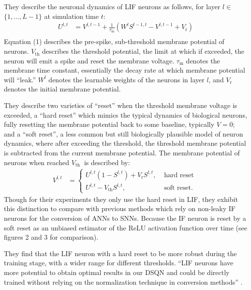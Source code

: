\documentclass[journal,onecolumn]{IEEEtran}
\begin{document}
They describe the neuronal dynamics of LIF neurons as follows, for
layer \(l \in\) \(\{1, \ldots, L-1\}\) at simulation time \(t\): \[
\begin{aligned}
U^{l, t} & =V^{l, t-1}+\frac{1}{\tau_{\mathrm{m}}}\left(W^l S^{l-1, t}-V^{l, t-1}+V_{\mathrm{r}}\right) \\
\end{aligned}
\] Equation (1) describes the pre-spike, sub-threshold membrane potential
of neurons. \(V_{\mathrm{th}}\) describes the threshold potential, the
limit at which if exceeded, the neuron will emit a spike and reset the
membrane voltage. \(\tau_{\mathrm{m}}\) denotes the membrane time
constant, essentially the decay rate at which membrane potential will
``leak.'' \(W^l\) denotes the learnable weights of the neurons in layer
\(l\), and \(V_{\mathrm{r}}\) denotes the initial membrane potential.

They describe two varieties of ``reset'' when the threshold membrane
voltage is exceeded, a ``hard reset'' which mimics the typical dynamics
of biological neurons, fully resetting the membrane potential back to
some baseline, typically \(V = 0\); and a ``soft reset'', a less common
but still biologically plausible model of neuron dynamics, where after
exceeding the threshold, the threshold membrane potential is subtracted
from the current membrane potential. The membrane potential of neurons
when reached \(V_{\text {th }}\) is described by: \[
\begin{aligned}
V^{l, t} & = \begin{cases}U^{l, t}\left(1-S^{l, t}\right)+V_{\mathrm{r}} S^{l, t}, & \text { hard reset } \\
U^{l, t}-V_{\mathrm{th}} S^{l, t}, & \text { soft reset. }\end{cases}
\end{aligned}
\] Though for their experiments they only use the hard reset in LIF,
they exhibit this distinction to compare with previous methods which
rely on non-leaky IF neurons for the conversion of ANNs to SNNs. Because the IF neuron is reset by a soft reset as an unbiased estimator of the
ReLU activation function over time (see figures 2 and 3
for comparison).




They find that the LIF neuron with a hard reset to be more robust during
the training stage, with a wider range for different thresholds. ``LIF
neurons have more potential to obtain optimal results in our DSQN and
could be directly trained without relying on the normalization technique
in conversion methods''
\autocite{liuHumanLevelControlDirectly2022}.
\end{document}
